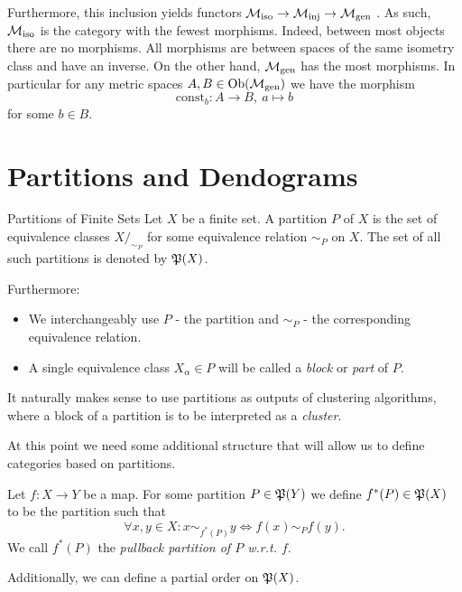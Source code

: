 Furthermore, this inclusion yields functors $\iso \to \inj \to \gen$ \cite[Def.~1.2.18]{Leinster2014-dc}.
As such, $\iso$ is the category with the fewest morphisms. Indeed, between most objects there are no morphisms.
All morphisms are between spaces of the same isometry class and have an inverse.
On the other hand, $\gen$ has the most morphisms. In particular for any metric spaces $A,B \in \ob(\gen)$ we have the morphism
$$
\mathrm{const}_b: A \to B, \ a \mapsto b
$$
for some $b \in B$.

\section{Partitions and Dendograms}
\label{section__partitions}

\begin{definition}{Partitions of Finite Sets}{}
Let $X$ be a finite set. A partition $P$ of $X$ is the set of equivalence classes $X/_{\sim_P}$ for some equivalence relation $\sim_P$ on $X$. The set of all such partitions is denoted by $\P(X)$.\par

\medskip Furthermore:
\begin{itemize}
    \item We interchangeably use $P$ - the partition and $\sim_P$ - the corresponding equivalence relation.
    \item A single equivalence class $X_\alpha \in P$ will be called a \emph{block} or \emph{part} of $P$.
\end{itemize}
\end{definition}

It naturally makes sense to use partitions as outputs of clustering algorithms, where a block of a partition is to be interpreted as a \emph{cluster}.

At this point we need some additional structure that will allow us to define categories based on partitions.

\begin{definition}{}{}
Let $f: X \to Y$ be a map. For some partition $P \in \P(Y)$ we define $f^*(P) \in \P(X)$ to be the partition such that
\begin{equation*}
    \forall x,y \in X: x \sim_{f^*(P)} y \iff f(x) \sim_P f(y).
\end{equation*}
We call $f^*(P)$ the \emph{pullback partition of $P$ w.r.t. $f$}.
\end{definition}

Additionally, we can define a partial order on $\P(X)$.

